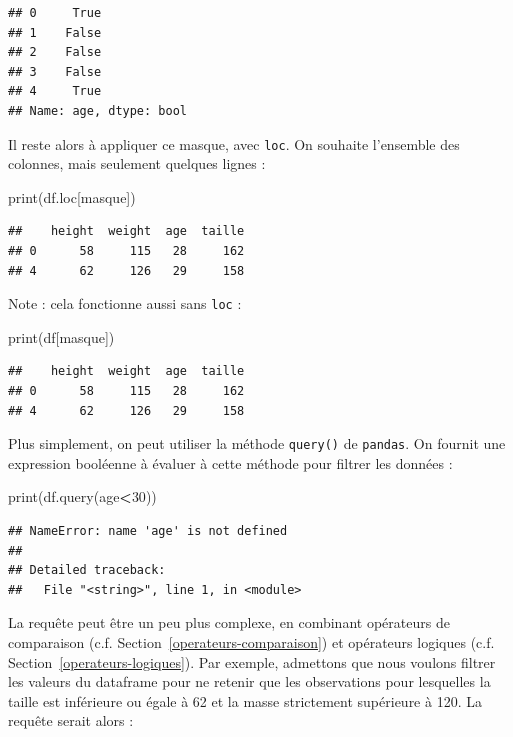 \documentclass[12pt,]{book}
\newenvironment{Shaded}{\begin{snugshade}}{\end{snugshade}}
\newcommand{\DecValTok}[1]{\textcolor[rgb]{0.00,0.00,0.81}{#1}}
\newcommand{\OperatorTok}[1]{\textcolor[rgb]{0.81,0.36,0.00}{\textbf{#1}}}
\newcommand{\BuiltInTok}[1]{#1}
\newcommand{\NormalTok}[1]{#1}
\numberwithin{equation}{section}
\numberwithin{countremarque}{section}
\begin{document}
\begin{lstlisting}
## 0     True
## 1    False
## 2    False
## 3    False
## 4     True
## Name: age, dtype: bool
\end{lstlisting}

Il reste alors à appliquer ce masque, avec \texttt{loc}. On souhaite
l'ensemble des colonnes, mais seulement quelques lignes :

\begin{Shaded}
\begin{Highlighting}[]
\BuiltInTok{print}\NormalTok{(df.loc[masque])}
\end{Highlighting}
\end{Shaded}

\begin{lstlisting}
##    height  weight  age  taille
## 0      58     115   28     162
## 4      62     126   29     158
\end{lstlisting}

Note : cela fonctionne aussi sans \texttt{loc} :

\begin{Shaded}
\begin{Highlighting}[]
\BuiltInTok{print}\NormalTok{(df[masque])}
\end{Highlighting}
\end{Shaded}

\begin{lstlisting}
##    height  weight  age  taille
## 0      58     115   28     162
## 4      62     126   29     158
\end{lstlisting}

Plus simplement, on peut utiliser la méthode \texttt{query()} de
\texttt{pandas}. On fournit une expression booléenne à évaluer à cette
méthode pour filtrer les données :

\begin{Shaded}
\begin{Highlighting}[]
\BuiltInTok{print}\NormalTok{(df.query(age}\OperatorTok{<}\DecValTok{30}\NormalTok{))}
\end{Highlighting}
\end{Shaded}

\begin{lstlisting}
## NameError: name 'age' is not defined
## 
## Detailed traceback: 
##   File "<string>", line 1, in <module>
\end{lstlisting}

La requête peut être un peu plus complexe, en combinant opérateurs de
comparaison (c.f. Section~\ref{operateurs-comparaison}) et opérateurs
logiques (c.f. Section~\ref{operateurs-logiques}). Par exemple,
admettons que nous voulons filtrer les valeurs du dataframe pour ne
retenir que les observations pour lesquelles la taille est inférieure ou
égale à 62 et la masse strictement supérieure à 120. La requête serait
alors :
\end{document}
